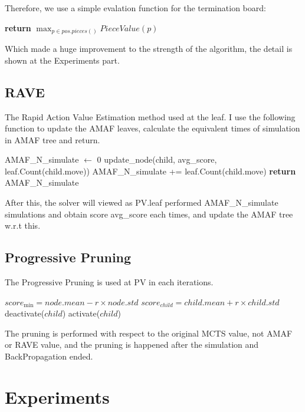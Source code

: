 \documentclass[a4paper, 12pt]{article}  %
\begin{document}
Therefore, we use a simple evalation function for the termination board:

\begin{algorithmic}
  \begin{algorithm}
      \State \textbf{return} $\max_{p\in pos.pieces()} PieceValue(p)$
    \EndProcedure
  \end{algorithm}
\end{algorithmic}

Which made a huge improvement to the strength of the algorithm, the detail is shown at the Experiments part.


\newpage

\subsection{RAVE}
The Rapid Action Value Estimation method used at the leaf.
I use the following function to update the AMAF leaves, calculate the equivalent times of simulation in AMAF tree and return.


\begin{algorithm}
    \begin{algorithmic}
          \State AMAF\_N\_simulate $\gets$ 0
              \State update\_node(child, avg\_score, leaf.Count(child.move))
              \State AMAF\_N\_simulate += leaf.Count(child.move)
              \EndIf
          \EndFor     
          \State \textbf{return} AMAF\_N\_simulate     
        \EndProcedure
    \end{algorithmic}
\end{algorithm}

After this, the solver will viewed as PV.leaf performed AMAF\_N\_simulate simulations and obtain score avg\_score each times, and update the AMAF tree w.r.t this.

\subsection{Progressive Pruning}
The Progressive Pruning is used at PV in each iterations.
\begin{algorithm}
  \begin{algorithmic}
      \State$score_{\min} = node.mean-r\times node.std$
        \State$score_{child} = child.mean + r\times child.std$
            \State deactivate($child$)
          \EndIf
        \Else
            \State activate($child$)
          \EndIf
        \EndIf
      \EndFor
    \EndProcedure
  \end{algorithmic}
\end{algorithm}

The pruning is performed with respect to the original MCTS value, not AMAF or RAVE value, and the pruning is happened after the simulation and BackPropagation ended.

\newpage

\section{Experiments}
\end{document}
